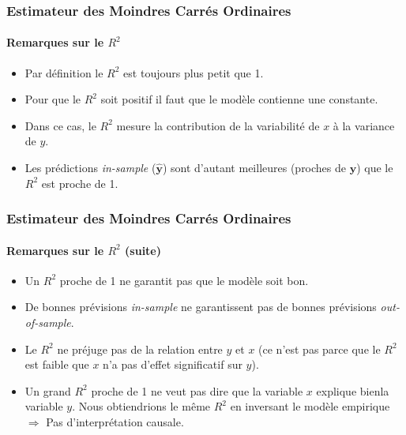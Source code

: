 \documentclass[10pt]{beamer}
\theoremstyle{plain}
\begin{document}
\begin{frame}
  \frametitle{Estimateur des Moindres Carrés Ordinaires}
  \framesubtitle {Remarques sur le  $R^2$}

  \begin{itemize}

  \item Par définition le $R^2$ est toujours plus petit que 1.\newline

  \item Pour que le $R^2$ soit positif il faut que le modèle contienne
    une constante.\newline

  \item Dans ce cas, le $R^2$ mesure la contribution de la variabilité de $x$ à la variance de $y$.\newline

  \item Les prédictions \textit{in-sample} ($\hat{\mathbf y}$) sont d'autant meilleures (proches de $\mathbf y$) que le $R^2$ est proche de 1.\newline

  \end{itemize}

\end{frame}


\begin{frame}
  \frametitle{Estimateur des Moindres Carrés Ordinaires}
  \framesubtitle {Remarques sur le  $R^2$ (suite)}


  \begin{itemize}

  \item Un $R^2$ proche de 1 ne garantit pas que le modèle soit \guillemotleft bon\guillemotright.\newline

  \item De bonnes prévisions \textit{in-sample} ne garantissent pas de bonnes prévisions \textit{out-of-sample}.\newline

  \item Le $R^2$ ne préjuge pas de la relation entre $y$ et $x$ (ce n'est pas parce que le $R^2$ est faible que $x$ n'a pas d'effet significatif sur $y$).\newline

  \item Un grand $R^2$ proche de 1 ne veut pas dire que la variable $x$ explique  \guillemotleft bien\guillemotright  la variable $y$. Nous obtiendrions le même  $R^2$ en inversant le modèle empirique $\Rightarrow$ Pas d'interprétation causale.

  \end{itemize}

\end{frame}
\end{document}
